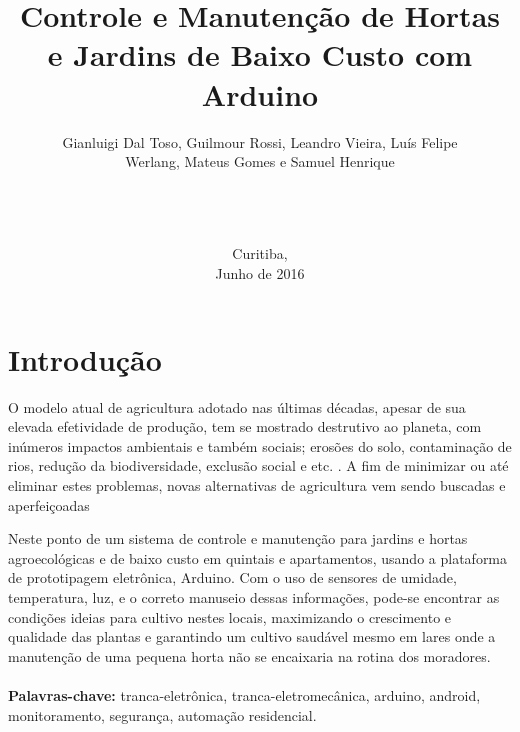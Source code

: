 \documentclass[a4paper,12pt]{article}
\begin{document}
\title{Controle e Manutenção de Hortas e Jardins de Baixo Custo com Arduino}
\author{Gianluigi Dal Toso, Guilmour Rossi, Leandro Vieira, Luís Felipe\\Werlang, Mateus Gomes e Samuel Henrique\\\texttt{}\\\\\\
}

\date{Curitiba, \\Junho de 2016}

\maketitle

\newpage


\tableofcontents


\newpage

\listoffigures

\newpage

\listoftables

\makenomenclature

\newpage
\section{Introdução}

	O modelo atual de agricultura adotado nas últimas décadas, apesar de sua elevada efetividade de produção, tem se mostrado destrutivo ao planeta, com inúmeros impactos ambientais e também sociais; erosões do solo, contaminação de rios, redução da biodiversidade, exclusão social e etc. \cite[p.~23]{medeiros}. A fim de minimizar ou até eliminar estes problemas, novas alternativas de agricultura vem sendo buscadas e aperfeiçoadas

Neste ponto  de um sistema de controle e manutenção para jardins e hortas agroecológicas e de baixo custo em quintais e apartamentos, usando a plataforma de prototipagem eletrônica, Arduino. Com o uso de sensores de umidade, temperatura, luz, e o correto manuseio dessas informações, pode-se encontrar as condições ideias para cultivo nestes locais, maximizando o crescimento e qualidade das plantas e garantindo um cultivo saudável mesmo em lares onde a manutenção de uma pequena horta não se encaixaria na rotina dos moradores.
  \textbf{\\\\Palavras-chave:} tranca-eletrônica, tranca-eletromecânica, arduino, android, monitoramento, segurança, automação residencial.
\end{document}
